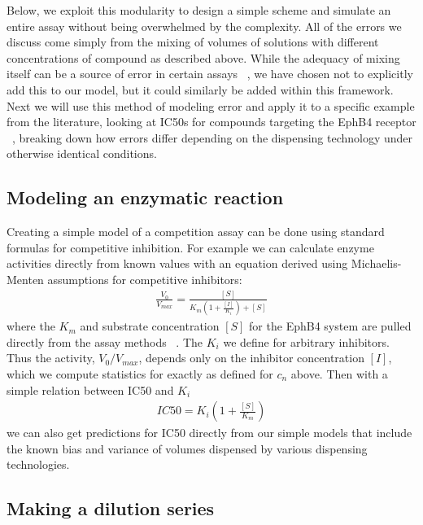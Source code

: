 \documentclass[aps,pre,twocolumn,nofootinbib,superscriptaddress,linenumbers]{revtex4-1}
\begin{document}
Below, we exploit this modularity to design a simple scheme and simulate an entire assay without being overwhelmed by the complexity.
All of the errors we discuss come simply from the mixing of volumes of solutions with different concentrations of compound as described above.
While the adequacy of mixing itself can be a source of error in certain assays ~\cite{walling_mixing_2007,weiss_modeling_2002,mitre_turbo-mixing_2007}, we have chosen not to explicitly add this to our model, but it could similarly be added within this framework.
Next we will use this method of modeling error and apply it to a specific example from the literature, looking at IC50s for compounds targeting the EphB4 receptor ~\cite{ekins_dispensing_2013,barlaam_novel_2009,barlaam_pyrimidine_2010}, breaking down how errors differ depending on the dispensing technology under otherwise identical conditions.

\subsection*{Modeling an enzymatic reaction}

Creating a simple model of a competition assay can be done using standard formulas for competitive inhibition. 
For example we can calculate enzyme activities directly from known values with an equation derived using Michaelis-Menten assumptions for competitive inhibitors: 
\begin{eqnarray}
\frac{V_{0}}{V_{max}} = \frac{[S]}{K_{m}(1+\frac{[I]}{K_{i}})+[S]} \label{equation:activity}
\end{eqnarray}
where the $K_{m}$ and substrate concentration $[S]$ for the EphB4 system are pulled directly from the assay methods ~\cite{barlaam_novel_2009,barlaam_pyrimidine_2010}. 
The $K_{i}$ we define for arbitrary inhibitors.
Thus the activity, $V_{0}/V_{max}$, depends only on the inhibitor concentration $[I]$, which we compute statistics for exactly as defined for $c_n$ above.
Then with a simple relation between IC50 and $K_{i}$
\begin{eqnarray}
IC50 = K_{i}(1+\frac{[S]}{K_{m}}) \label{equation:IC50}
\end{eqnarray} 
we can also get predictions for IC50 directly from our simple models that include the known bias and variance of volumes dispensed by various dispensing technologies.

\subsection*{Making a dilution series}
\end{document}
